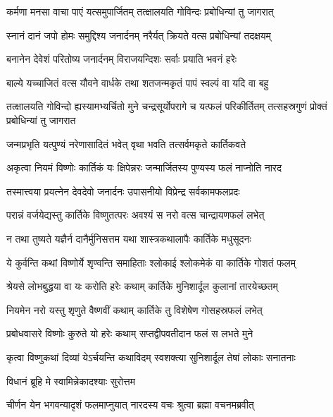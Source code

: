 \twolineshloka
{कर्मणा मनसा वाचा पाएं यत्समुपार्जितम्}
{तत्क्षालयति गोविन्दः प्रबोधिन्यां तु जागरात्} %

\twolineshloka
{स्नानं दानं जपो होमः समुद्दिश्य जनार्दनम्}
{नरैर्यत् क्रियते वत्स प्रबोधिन्यां तदक्षयम्} %

\twolineshloka
{बनानेन देवेशं परितोष्य जनार्दनम्}
{विराजयन्दिशः सर्वाः प्रयाति भवनं हरेः} %

\twolineshloka
{बाल्ये यच्चाजितं वत्स यौवने वार्धके तथा}
{शतजन्मकृतं पापं स्वल्पं वा यदि वा बहु} %


\threelineshloka
{तत्क्षालयति गोविन्दो ह्यस्यामभ्यर्चितो मुने}
{चन्द्रसूर्योपरागे च यत्फलं परिकीर्तितम्}
{तत्सहस्रगुणं प्रोक्तं प्रबोधिन्यां तु जागरात} %

\twolineshloka
{जन्मप्रभृति यत्पुण्यं नरेणासादितं भवेत्}
{वृथा भवति तत्सर्वमकृते कार्तिकवते} %

\twolineshloka
{अकृत्वा नियमं विष्णोः कार्तिकं यः क्षिपेन्नरः}
{जन्मार्जितस्य पुण्यस्य फलं नाप्नोति नारद} %

\twolineshloka
{तस्मात्त्वया प्रयत्नेन देवदेवो जनार्दनः}
{उपासनीयो विप्रेन्द्र सर्वकामफलप्रदः} %

\twolineshloka
{परान्नं वर्जयेद्यस्तु कार्तिके विष्णुतत्परः}
{अवश्यं स नरो वत्स चान्द्रायणफलं लभेत्} %

\twolineshloka
{न तथा तुष्यते यज्ञैर्न दानैर्मुनिसत्तम}
{यथा शास्त्रकथालापैः कार्तिके मधुसूदनः} %

\twolineshloka
{ये कुर्वन्ति कथां विष्णोर्ये शृण्वन्ति समाहिताः}
{श्लोकाई श्लोकमेकं वा कार्तिके गोशतं फलम्} %

\twolineshloka
{श्रेयसे लोभबुद्धया वा यः करोति हरेः कथाम्}
{कार्तिके मुनिशार्दूल कुलानां तारयेच्छतम्} %

\twolineshloka
{नियमेन नरो यस्तु शृणुते वैष्णवीं कथाम्}
{कार्तिके तु विशेषेण गोसहस्रफलं लभेत्} %

\twolineshloka
{प्रबोधवासरे विष्णोः कुरुते यो हरेः कथाम्}
{सप्तद्वीपवतीदान फलं स लभते मुने} %

\twolineshloka
{कृत्वा विष्णुकथां दिव्यां येऽर्चयन्ति कथाविदम्}
{स्वशक्त्या सुनिशार्दूल तेषां लोकाः सनातनाः} %



\onelineshloka
{विधानं ब्रूहि मे स्वामिन्नेकादश्याः सुरोत्तम} %

\twolineshloka
{चीर्णन येन भगवन्यादृशं फलमाप्नुयात्}
{नारदस्य वचः श्रुत्वा ब्रह्मा वचनमब्रवीत्} %

